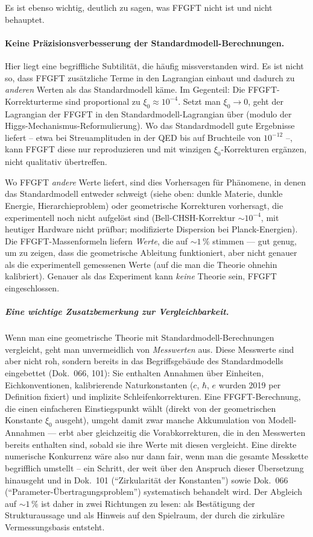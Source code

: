 Es ist ebenso wichtig, deutlich zu sagen, was FFGFT nicht ist und
nicht behauptet.

\paragraph{Keine Präzisionsverbesserung der Standardmodell-Berechnungen.}
Hier liegt eine begriffliche Subtilität, die häufig
missverstanden wird. Es ist nicht so, dass FFGFT zusätzliche Terme
in den Lagrangian einbaut und dadurch zu \emph{anderen} Werten als
das Standardmodell käme. Im Gegenteil: Die FFGFT-Korrekturterme sind
proportional zu $\xi_0 \approx 10^{-4}$. Setzt man $\xi_0 \to 0$,
geht der Lagrangian der FFGFT in den Standardmodell-Lagrangian über
(modulo der Higgs-Mechanismus-Reformulierung). Wo das Standardmodell
gute Ergebnisse liefert -- etwa bei Streuamplituden in der QED bis
auf Bruchteile von $10^{-12}$ --, kann FFGFT diese nur reproduzieren
und mit winzigen $\xi_0$-Korrekturen ergänzen, nicht qualitativ
übertreffen.

Wo FFGFT \emph{andere} Werte liefert, sind dies Vorhersagen für
Phänomene, in denen das Standardmodell entweder schweigt
(siehe oben: dunkle Materie, dunkle Energie, Hierarchieproblem)
oder geometrische Korrekturen vorhersagt, die experimentell noch
nicht aufgelöst sind (Bell-CHSH-Korrektur $\sim 10^{-4}$, mit heutiger Hardware nicht
prüfbar; modifizierte Dispersion bei Planck-Energien). Die FFGFT-Massenformeln liefern
\emph{Werte}, die auf $\sim 1\,\%$ stimmen --- gut genug, um zu
zeigen, dass die geometrische Ableitung funktioniert, aber nicht
genauer als die experimentell gemessenen Werte (auf die man die
Theorie ohnehin kalibriert). Genauer als das Experiment kann
\emph{keine} Theorie sein, FFGFT eingeschlossen.

\subparagraph{Eine wichtige Zusatzbemerkung zur Vergleichbarkeit.}
Wenn man eine geometrische Theorie mit Standardmodell-Berechnungen
vergleicht, geht man unvermeidlich von \emph{Messwerten} aus. Diese
Messwerte sind aber nicht roh, sondern bereits in das Begriffsgebäude
des Standardmodells eingebettet (Dok.~066, 101): Sie enthalten
Annahmen über Einheiten, Eichkonventionen, kalibrierende
Naturkonstanten ($c$, $\hbar$, $e$ wurden 2019 per Definition fixiert)
und implizite Schleifenkorrekturen. Eine FFGFT-Berechnung, die einen
einfacheren Einstiegspunkt wählt (direkt von der geometrischen
Konstante $\xi_0$ ausgeht), umgeht damit zwar manche Akkumulation von
Modell-Annahmen --- erbt aber gleichzeitig die Vorabkorrekturen, die
in den Messwerten bereits enthalten sind, sobald sie ihre Werte mit
diesen vergleicht. Eine direkte numerische Konkurrenz wäre also nur
dann fair, wenn man die gesamte Messkette begrifflich umstellt --
ein Schritt, der weit über den Anspruch dieser Übersetzung hinausgeht
und in Dok.~101 (\enquote{Zirkularität der Konstanten}) sowie
Dok.~066 (\enquote{Parameter-Übertragungsproblem}) systematisch
behandelt wird. Der Abgleich auf $\sim 1\,\%$ ist daher in zwei
Richtungen zu lesen: als Bestätigung der Strukturaussage und als
Hinweis auf den Spielraum, der durch die zirkuläre Vermessungsbasis
entsteht.


